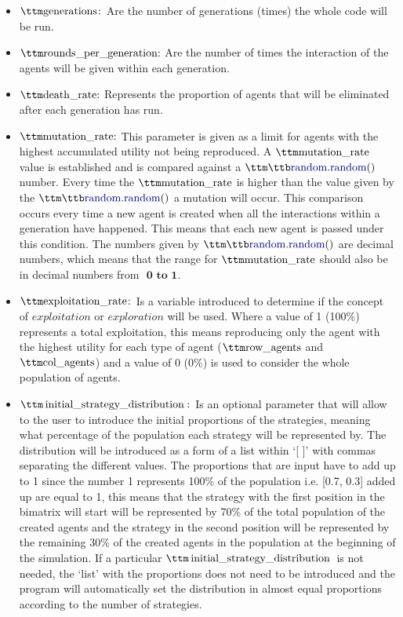 \begin{itemize}
	\item $\pythoninline{generations:}$ Are the number of generations (times) the whole code will be run.
	\item $\pythoninline{rounds\_per\_generation:}$ Are the number of times the interaction of the agents will be given within each generation. 
	\item $\pythoninline{death\_rate:}$ Represents the proportion of agents that will be eliminated after each generation has run.
	\item $\pythoninline{mutation\_rate:}$ This parameter is given as a limit for agents with the highest accumulated utility not being reproduced. A $\pythoninline{mutation\_rate}$ value is established and is compared against a $\pythoninline{random.random()}$ number. Every time the $\pythoninline{mutation\_rate}$ is higher than the value given by the $\pythoninline{random.random()}$ a mutation will occur. This comparison occurs every time a new agent is created when all the interactions within a generation have happened. This means that each new agent is passed under this condition. The numbers given by $\pythoninline{random.random()}$ are decimal numbers, which means that the range for $\pythoninline{mutation\_rate}$ should also be in decimal numbers from $\textbf{ 0 to 1}$.
	\item $\pythoninline{exploitation\_rate:}$ Is a variable introduced to determine if the concept of $\textit{exploitation}$ or $\textit{exploration}$ will be used. Where a value of 1 (100$\%$) represents a total exploitation, this means reproducing only the agent with the highest utility for each type of agent ($\pythoninline{row\_agents}$ and $\pythoninline{col\_agents}$) and a value of 0 (0$\%$) is used to consider the whole population of agents.
	\item $\pythoninline{initial\_strategy\_distribution:}$ Is an optional parameter that will allow to the user to introduce the initial proportions of the strategies, meaning what percentage of the population each strategy will be represented by. The distribution will  be introduced as a form of a list within `[ ]' with commas separating the different values. The proportions that are input have to add up to 1 since the number 1 represents 100\% of the population i.e. [0.7, 0.3] added up are equal to 1, this means that the strategy with the first position in the bimatrix will start will be represented by 70\% of the total population of the created agents and the strategy in the second position will be represented by the remaining 30\% of the created agents in the population at the beginning of the simulation. If a particular $\pythoninline{initial\_strategy\_distribution}$ is not needed, the `list' with the proportions does not need to be introduced and the program will automatically set the distribution in almost equal proportions according to the number of strategies.
\end{itemize}

